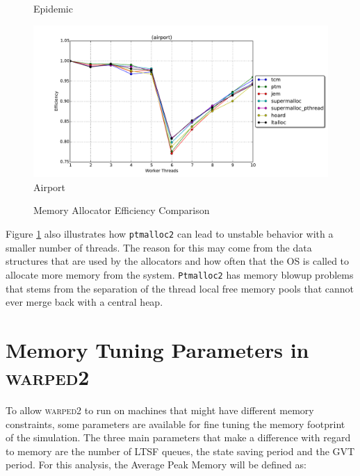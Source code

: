 \documentclass[11pt]{book}
\begin{document}
\begin{figure}
\begin{minipage}{.5\textwidth}
\begin{center}
      Epidemic \\
    \end{center}
  \end{minipage}%
  \begin{minipage}{.5\textwidth}
    \begin{center}
      \includegraphics[width=\textwidth,keepaspectratio,quiet]{figs/memory_allocation/airport_efficiency.pdf} \\
      Airport \\
    \end{center}
  \end{minipage}
  \caption{Memory Allocator Efficiency Comparison}\label{allocator_analysis_efficiency}
\end{figure}

Figure \ref{allocator_analysis_efficiency} also illustrates how \texttt{ptmalloc2} can lead to
unstable behavior with a smaller number of threads.  The reason for this may come from the data
structures that are used by the allocators and how often that the OS is called to allocate more
memory from the system.  \texttt{Ptmalloc2} has memory blowup problems that stems from the
separation of the thread local free memory pools that cannot ever merge back with a central heap. 

\section{Memory Tuning Parameters in \textsc{warped2}}

To allow \textsc{warped2} to run on machines that might have different memory constraints, some
parameters are available for fine tuning the memory footprint of the simulation.  The three main
parameters that make a difference with regard to memory are the number of LTSF queues, the state
saving period and the GVT period.  For this analysis, the Average Peak Memory will be defined as:
\end{document}
